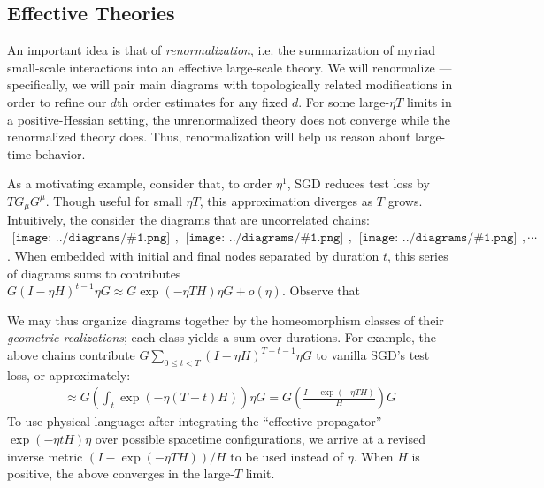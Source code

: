 \documentclass{article}
\newcommand{\wrap}[1]{\left(#1\right)}
\newcommand{\sdia}[1]{\begin{gathered}\texttt{[image: ../diagrams/\#1.png]}\end{gathered}}
\begin{document}

    \subsection{Effective Theories} \label{subsect:effective}
        An important idea is that of \emph{renormalization}, i.e. the
        summarization of myriad small-scale interactions into an effective
        large-scale theory.  We will renormalize --- specifically, we will
        pair main diagrams with topologically related modifications in order
        to refine our $d$th order estimates for any fixed $d$.  For
        some large-$\eta T$ limits in a positive-Hessian setting, the
        unrenormalized theory does not converge while the renormalized theory
        does.  Thus, renormalization will help us reason about large-time
        behavior. 

        As a motivating example, consider that, to order $\eta^1$, SGD reduces
        test loss by $T G_\mu G^\mu$.  Though useful for small $\eta T$, this
        approximation diverges as $T$ grows.  Intuitively, the  
        consider the diagrams that are uncorrelated
        chains:
        $
            \sdia{(0-1)(01)}, \sdia{(0-1-2)(01-12)},
            \sdia{(0-1-2-3)(01-12-23)}, \cdots
        $.  
        When embedded with initial and
        final nodes separated by duration $t$, this series of diagrams sums to
        contributes
        $
            G (I-\eta H)^{t-1} \eta G
            \approx
            G \exp(-\eta T H) \eta G
            +
            o(\eta)
        $.
        Observe that  

        We may thus organize diagrams together by the homeomorphism classes of
        their \emph{geometric realizations}; each class yields a sum over
        durations.  For example, the above chains contribute 
        $G \sum_{0\leq t<T} (I-\eta H)^{T-t-1} \eta G$
        to vanilla SGD's test loss, or approximately:
        \begin{align*}
            \approx
            G \wrap{\int_t \exp(-\eta (T-t) H)} \eta G
            =
            G \wrap{\frac{I - \exp(-\eta T H)}{H}} G
        \end{align*}
        To use physical language: after integrating the
        ``effective propagator'' $\exp(-\eta t H) \eta$ over possible
        spacetime configurations, we arrive at a revised inverse metric
        $
            \wrap{I - \exp(-\eta T H)}/H
        $
        to be used instead of $\eta$.  When $H$ is positive, the above
        converges in the large-$T$ limit.
\end{document}
